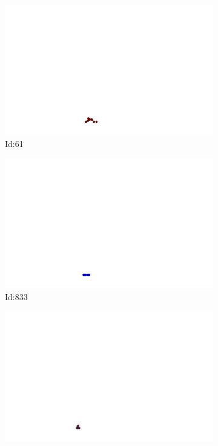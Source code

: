 \documentclass[12pt,twoside]{report}
\begin{document}
\begin{figure}
\centering
\begin{subfigure}[b]{0.20\textwidth}
\centering
\includegraphics[width=\textwidth]{../../trajectories/61.png}
\caption{Id:61}
\end{subfigure}
\begin{subfigure}[b]{0.20\textwidth}
\centering
\includegraphics[width=\textwidth]{../../trajectories/833.png}
\caption{Id:833}
\end{subfigure}
\begin{subfigure}[b]{0.20\textwidth}
\centering
\includegraphics[width=\textwidth]{../../trajectories/837.png}

\end{subfigure}
\end{figure}
\end{document}
